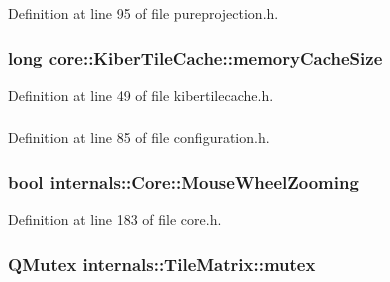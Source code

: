 \-Definition at line 95 of file pureprojection.\-h.

\hypertarget{group___o_p_map_widget_gae96e4700fe984a52afd8c8016dc1295b}{
\subsubsection[{memory\-Cache\-Size}]{\setlength{\rightskip}{0pt plus 5cm}long {\bf core\-::\-Kiber\-Tile\-Cache\-::memory\-Cache\-Size}}}\label{group___o_p_map_widget_gae96e4700fe984a52afd8c8016dc1295b}


\-Definition at line 49 of file kibertilecache.\-h.

\hypertarget{group___o_p_map_widget_gacaef660cdedd3dc5c76abc6f6872b149}{
\subsubsection[{\-Missing\-Data\-Font}]{}}\label{group___o_p_map_widget_gacaef660cdedd3dc5c76abc6f6872b149}


\-Definition at line 85 of file configuration.\-h.

\hypertarget{group___o_p_map_widget_ga051b1520271b875b55fa1023041a16e6}{
\subsubsection[{\-Mouse\-Wheel\-Zooming}]{\setlength{\rightskip}{0pt plus 5cm}bool {\bf internals\-::\-Core\-::\-Mouse\-Wheel\-Zooming}}}\label{group___o_p_map_widget_ga051b1520271b875b55fa1023041a16e6}


\-Definition at line 183 of file core.\-h.

\hypertarget{group___o_p_map_widget_gae5c51dfc2c2d290c958e335bef18f0a1}{
\subsubsection[{mutex}]{\setlength{\rightskip}{0pt plus 5cm}\-Q\-Mutex {\bf internals\-::\-Tile\-Matrix\-::mutex}}}\label{group___o_p_map_widget_gae5c51dfc2c2d290c958e335bef18f0a1}


